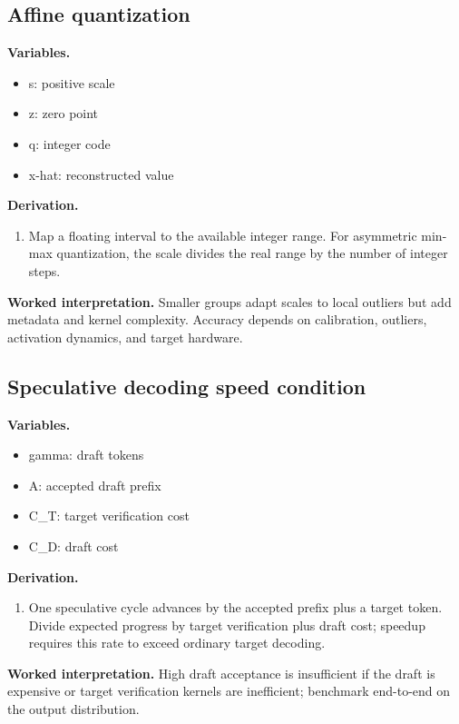 \subsection{Affine quantization}
\textbf{Variables.}\begin{itemize}
\item s: positive scale
\item z: zero point
\item q: integer code
\item x-hat: reconstructed value
\end{itemize}
\textbf{Derivation.}\begin{derivation}\begin{enumerate}
\item Map a floating interval to the available integer range. For asymmetric min-max quantization, the scale divides the real range by the number of integer steps.
\end{enumerate}\end{derivation}
\textbf{Worked interpretation.} Smaller groups adapt scales to local outliers but add metadata and kernel complexity. Accuracy depends on calibration, outliers, activation dynamics, and target hardware.
\subsection{Speculative decoding speed condition}
\textbf{Variables.}\begin{itemize}
\item gamma: draft tokens
\item A: accepted draft prefix
\item C\_T: target verification cost
\item C\_D: draft cost
\end{itemize}
\textbf{Derivation.}\begin{derivation}\begin{enumerate}
\item One speculative cycle advances by the accepted prefix plus a target token. Divide expected progress by target verification plus draft cost; speedup requires this rate to exceed ordinary target decoding.
\end{enumerate}\end{derivation}
\textbf{Worked interpretation.} High draft acceptance is insufficient if the draft is expensive or target verification kernels are inefficient; benchmark end-to-end on the output distribution.
